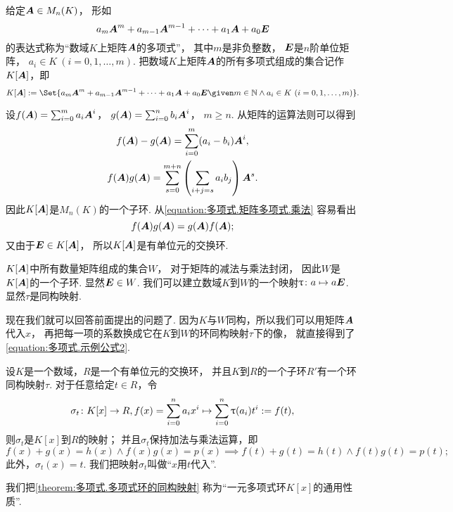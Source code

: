 给定\(\boldsymbol{A}\in M_n(K)\)，
形如\[
	a_m \boldsymbol{A}^m + a_{m-1} \boldsymbol{A}^{m-1} + \dotsb + a_1 \boldsymbol{A} + a_0 \boldsymbol{E}
\]的表达式称为“数域\(K\)上矩阵\(\boldsymbol{A}\)的多项式”，
其中\(m\)是非负整数，
\(\boldsymbol{E}\)是\(n\)阶单位矩阵，
\(a_i \in K\ (i=0,1,\dotsc,m)\).
把数域\(K\)上矩阵\(\boldsymbol{A}\)的所有多项式组成的集合记作\(K[\boldsymbol{A}]\)，即\[
	K[\vb{A}]
	\defeq
	\Set{
		a_m \vb{A}^m + a_{m-1} \vb{A}^{m-1} + \dotsb + a_1 \vb{A} + a_0 \vb{E}
		\given
		m \in \mathbb{N}
		\land
		a_i \in K\ (i=0,1,\dotsc,m)
	}.
\]

设\(f(\boldsymbol{A})=\sum_{i=0}^m a_i \boldsymbol{A}^i\)，
\(g(\boldsymbol{A})=\sum_{i=0}^n b_i \boldsymbol{A}^i\)，
\(m \geq n\).
从矩阵的运算法则可以得到
\begin{gather}
	f(\boldsymbol{A})-g(\boldsymbol{A})
	= \sum_{i=0}^m (a_i - b_i) \boldsymbol{A}^i, \\
	f(\boldsymbol{A}) g(\boldsymbol{A})
	= \sum_{s=0}^{m+n} \left( \sum_{i+j=s} a_i b_j \right) \boldsymbol{A}^s.
	\label{equation:多项式.矩阵多项式.乘法}
\end{gather}
因此\(K[\boldsymbol{A}]\)是\(M_n(K)\)的一个子环.
从\cref{equation:多项式.矩阵多项式.乘法} 容易看出\[
	f(\boldsymbol{A}) g(\boldsymbol{A}) = g(\boldsymbol{A}) f(\boldsymbol{A});
\]
又由于\(\boldsymbol{E} \in K[\boldsymbol{A}]\)，
所以\(K[\boldsymbol{A}]\)是有单位元的交换环.

\(K[\boldsymbol{A}]\)中所有数量矩阵组成的集合\(W\)，
对于矩阵的减法与乘法封闭，
因此\(W\)是\(K[\boldsymbol{A}]\)的一个子环.
显然\(\boldsymbol{E} \in W\).
我们可以建立数域\(K\)到\(W\)的一个映射\(\uptau\colon a \mapsto a \boldsymbol{E}\).
显然\(\tau\)是同构映射.

现在我们就可以回答前面提出的问题了.
因为\(K\)与\(W\)同构，所以我们可以用矩阵\(\boldsymbol{A}\)代入\(x\)，
再把每一项的系数换成它在\(K\)到\(W\)的环同构映射\(\tau\)下的像，
就直接得到了\cref{equation:多项式.示例公式2}.

\begin{theorem}\label{theorem:多项式.多项式环的同构映射}
设\(K\)是一个数域，\(R\)是一个有单位元的交换环，
并且\(K\)到\(R\)的一个子环\(R'\)有一个环同构映射\(\tau\).
对于任意给定\(t \in R\)，令\[
	\sigma_t\colon
	K[x] \to R,
	f(x)=\sum_{i=0}^n a_i x^i \mapsto \sum_{i=0}^n \uptau(a_i) t^i := f(t),
\]
则\(\sigma_t\)是\(K[x]\)到\(R\)的映射；
并且\(\sigma_t\)保持加法与乘法运算，即\[
	f(x)+g(x)=h(x) \land f(x) g(x) = p(x)
	\implies
	f(t)+g(t)=h(t) \land f(t) g(t) = p(t);
\]
此外，\(\sigma_t(x) = t\).
我们把映射\(\sigma_t\)叫做“\(x\)用\(t\)代入”.
\end{theorem}

我们把\cref{theorem:多项式.多项式环的同构映射}
称为“一元多项式环\(K[x]\)的通用性质”.

